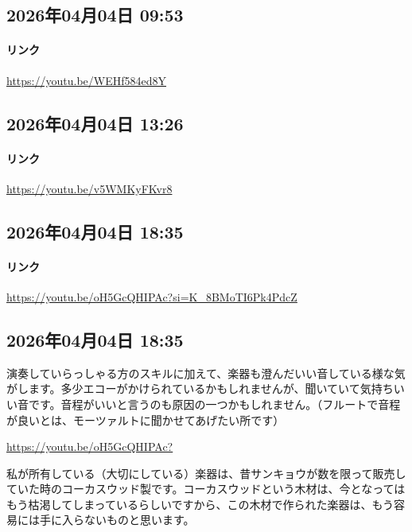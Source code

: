 \subsection*{2026年04月04日 09:53}

\paragraph{リンク}
\url{https://youtu.be/WEHf584ed8Y}

\subsection*{2026年04月04日 13:26}

\paragraph{リンク}
\url{https://youtu.be/v5WMKyFKvr8}

\subsection*{2026年04月04日 18:35}

\paragraph{リンク}
\url{https://youtu.be/oH5GcQHIPAc?si=K_8BMoTI6Pk4PdcZ}

\subsection*{2026年04月04日 18:35}

演奏していらっしゃる方のスキルに加えて、楽器も澄んだいい音している様な気がします。多少エコーがかけられているかもしれませんが、聞いていて気持ちいい音です。音程がいいと言うのも原因の一つかもしれません。（フルートで音程が良いとは、モーツァルトに聞かせてあげたい所です）

\url{https://youtu.be/oH5GcQHIPAc?}

私が所有している（大切にしている）楽器は、昔サンキョウが数を限って販売していた時のコーカスウッド製です。コーカスウッドという木材は、今となってはもう枯渇してしまっているらしいですから、この木材で作られた楽器は、もう容易には手に入らないものと思います。

